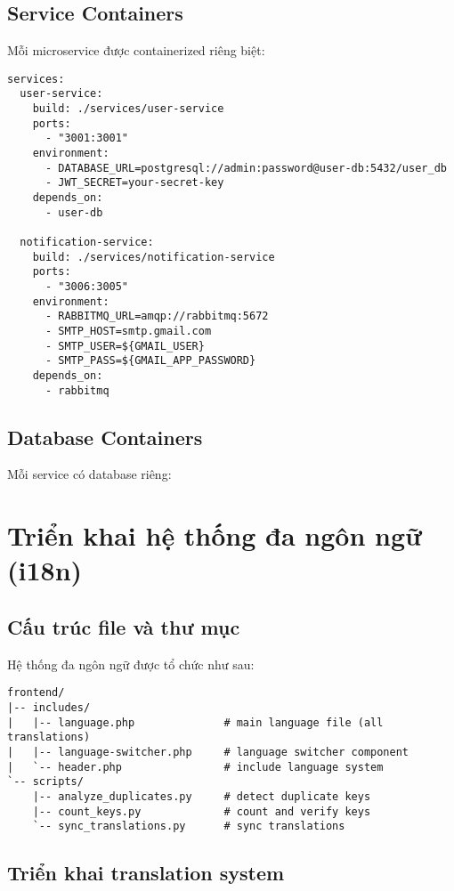 \documentclass[12pt,a4paper]{report}
\begin{document}
\subsection{Service Containers}
Mỗi microservice được containerized riêng biệt:

\begin{lstlisting}[language=text, caption=docker-compose.yml excerpt]
services:
  user-service:
    build: ./services/user-service
    ports:
      - "3001:3001"
    environment:
      - DATABASE_URL=postgresql://admin:password@user-db:5432/user_db
      - JWT_SECRET=your-secret-key
    depends_on:
      - user-db
      
  notification-service:
    build: ./services/notification-service
    ports:
      - "3006:3005"
    environment:
      - RABBITMQ_URL=amqp://rabbitmq:5672
      - SMTP_HOST=smtp.gmail.com
      - SMTP_USER=${GMAIL_USER}
      - SMTP_PASS=${GMAIL_APP_PASSWORD}
    depends_on:
      - rabbitmq
\end{lstlisting}

\subsection{Database Containers}
Mỗi service có database riêng:


\section{Triển khai hệ thống đa ngôn ngữ (i18n)}

\subsection{Cấu trúc file và thư mục}
Hệ thống đa ngôn ngữ được tổ chức như sau:
\begin{lstlisting}[language=text, caption=i18n directory structure]
frontend/
|-- includes/
|   |-- language.php              # main language file (all translations)
|   |-- language-switcher.php     # language switcher component
|   `-- header.php                # include language system
`-- scripts/
    |-- analyze_duplicates.py     # detect duplicate keys
    |-- count_keys.py             # count and verify keys
    `-- sync_translations.py      # sync translations
\end{lstlisting}

\subsection{Triển khai translation system}
\end{document}
